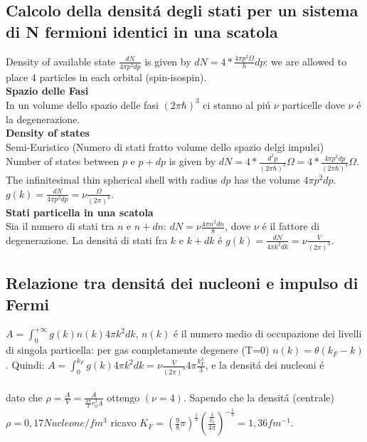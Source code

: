 \documentclass[main.tex]{subfiles}
\begin{document}
\subsection{Calcolo della densit\'a degli stati per un sistema di N fermioni identici in una scatola}
Density of available state $\frac{dN}{4\pi p^2dp}$ is given by $dN=4*\frac{4\pi p^2\Omega}{h}dp$: we are allowed to place 4 particles in each orbital (spin-isospin).\\
\textbf{Spazio delle Fasi}\\
In un volume dello spazio delle fasi $(2\pi\hbar)^3$ ci stanno al pi\'u $\nu$ particelle dove $\nu$ \'e la degenerazione.\\
\textbf{Density of states}\\
Semi-Euristico (Numero di stati fratto volume dello spazio delgi impulsi)\\
Number of states between $p$ e $p+dp$ is given by $dN=4*\frac{d^3p}{(2\pi\hbar)^3}\Omega=4*\frac{4\pi p^2dp}{(2\pi\hbar)^3}\Omega$.\\
The infinitesimal thin spherical shell with radius $dp$ has the volume $4\pi p^2dp$.\\
$g(k)=\frac{dN}{4\pi p^2dp}=\nu\frac{\Omega}{(2\pi)^3}$.\\

\textbf{Stati particella in una scatola}\\
Sia il numero di stati tra $n$ e $n+dn$: $dN=\nu \frac{4\pi n^2dn}{8}$, dove $\nu$ \'e il fattore di degenerazione. La densit\'a di stati fra $k$ e $k+dk$ \'e $g(k)=\frac{dN}{4\pi k^2dk}=\nu \frac{V}{(2\pi)^3}$.\\

\subsection{Relazione tra densit\'a dei nucleoni e impulso di Fermi}
$A=\int_0^{+\infty}g(k)n(k)4\pi k^2dk$, $n(k)$ \'e il numero medio di occupazione dei livelli di singola particella: per gas completamente degenere (T=0)    
 $n(k)=\theta (k_F-k)$. Quindi: $A=\int_0^{k_F}g(k)4\pi k^2dk=\nu \frac{V}{(2\pi)^3}4\pi \frac{k_F^3}{3}$, e la densit\'a dei nucleoni \'e\\
\\
dato che $\rho=\frac{A}{V}=\frac{A}{\frac{4\pi}{3}r_0^3A}$ ottengo  $(\nu=4)$.
Sapendo che la densit\'a (centrale) $\rho=0,17 Nucleone/fm^3$ ricavo $K_F=(\frac{9}{8}\pi)^{\frac{1}{3}}(\frac{\frac{3}{\rho_0}}{4\pi})^{-\frac{1}{3}}=1,36 fm^{-1}$.
\end{document}
